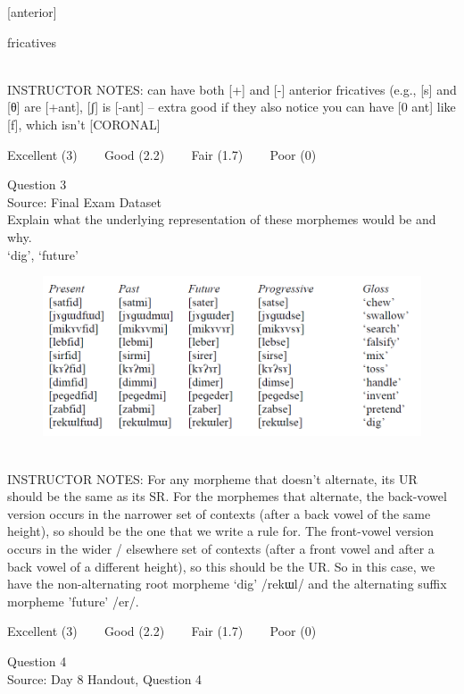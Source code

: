 \documentclass[12pt]{article}
\begin{document}
{[anterior]}

fricatives


~\\
INSTRUCTOR NOTES: can have both [+] and [-] anterior fricatives (e.g., [s] and [θ] are [+ant], [ʃ] is [-ant] -- extra good if they also notice you can have [0 ant] like [f], which isn't [CORONAL]


\vfill
Excellent (3) ~~~ Good (2.2) ~~~ Fair (1.7) ~~~ Poor (0)
\newpage

{\large Question 3}\\

Source: Final Exam Dataset\\

Explain what the underlying representation of these morphemes would be and why.\\

`dig', `future'

\begin{figure}[H]
\includegraphics{../images/final_dataset.png}
\end{figure}

~\\
INSTRUCTOR NOTES: For any morpheme that doesn’t alternate, its UR should be the same as its SR.  For the morphemes that alternate, the back-vowel version occurs in the narrower set of contexts (after a back vowel of the same height), so should be the one that we write a rule for. The front-vowel version occurs in the wider / elsewhere set of contexts (after a front vowel and after a back vowel of a different height), so this should be the UR. So in this case, we have the non-alternating root morpheme ‘dig’ /rekɯl/ and the alternating suffix morpheme 'future' /er/.


\vfill
Excellent (3) ~~~ Good (2.2) ~~~ Fair (1.7) ~~~ Poor (0)
\newpage

{\large Question 4}\\

Source: Day 8 Handout, Question 4\\
\end{document}
